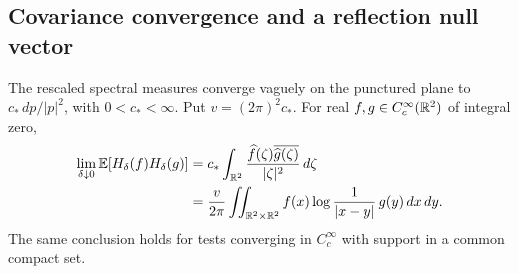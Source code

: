 \subsection{Covariance convergence and a reflection null vector}

\begin{theorem}
\label{thm:plane-covariance}
The rescaled spectral measures converge vaguely on the punctured plane to
\(c_*\,dp/|p|^2\), with \(0<c_*<\infty\). Put \(v=(2\pi)^2c_*\).
For real \(f,g\in C_c^\infty(\mathbb R^2)\) of integral zero,
\begin{align}
 \label{eq:plane-covariance}
 \lim_{\delta\downarrow0}\mathbb E[H_\delta(f)H_\delta(g)]
 &=c_*\int_{\mathbb R^2}
      \frac{\widehat f(\zeta)\overline{\widehat g(\zeta)}}{|\zeta|^2}\,d\zeta
 \notag\\
 &=\frac{v}{2\pi}\iint_{\mathbb R^2\times\mathbb R^2}
       f(x)\log\frac1{|x-y|}\,g(y)\,dx\,dy.
\end{align}
The same conclusion holds for tests converging in \(C_c^\infty\) with support
in a common compact set.
\end{theorem}

